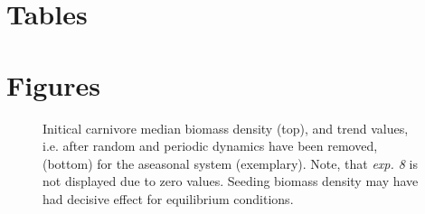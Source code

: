 \begin{appendices}
\chapter{Tables}
%
%




%

%
\chapter{Figures}
\begin{figure}
\centering

\caption[Initial carnivore biomass density for the aseasonal system]{Initical carnivore median biomass density (top), and trend values, i.e. after random and periodic dynamics have been removed, (bottom) for the aseasonal system (exemplary). Note, that \textit{exp. 8} is not displayed due to zero values. Seeding biomass density may have had decisive effect for equilibrium conditions.}
\label{fig:app:tsinit}
\end{figure}
%
\end{appendices}